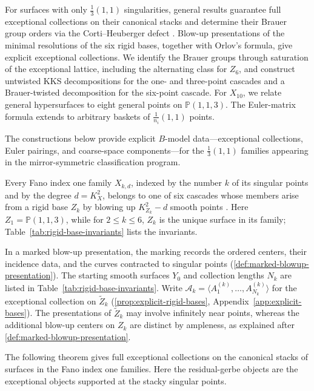 \documentclass[11pt]{article}
\theoremstyle{plain}
\theoremstyle{definition}
\theoremstyle{remark}
\begin{document}
For surfaces with only $\tfrac13(1,1)$ singularities, general results guarantee full exceptional collections on their canonical stacks and determine their Brauer group orders via the Corti--Heuberger defect \cite[Section~2.1, Proposition~18(b), Lemma~28]{Corti2016}. Blow-up presentations of the minimal resolutions of the six rigid bases, together with Orlov's formula, give explicit exceptional collections. We identify the Brauer groups through saturation of the exceptional lattice, including the alternating class for $Z_6$, and construct untwisted KKS decompositions for the one- and three-point cascades and a Brauer-twisted decomposition for the six-point cascade. For $X_{10}$, we relate general hypersurfaces to eight general points on $\mathbb P(1,1,3)$. The Euler-matrix formula extends to arbitrary baskets of $\tfrac1{n_i}(1,1)$ points.

The constructions below provide explicit $B$-model data---exceptional
collections, Euler pairings, and coarse-space components---for the
$\tfrac13(1,1)$ families appearing in the mirror-symmetric classification
program.

Every Fano index one family $X_{k,d}$, indexed by the number $k$ of its singular points and by the degree $d=K_X^2$, belongs to one of six cascades whose members arise from a rigid base $Z_k$ by blowing up $K_{Z_k}^2-d$ smooth points \cite[Theorems~4 and~6, Corollary~8]{Corti2016}. Here $Z_1=\mathbb P(1,1,3)$, while for $2\le k\le6$, $Z_k$ is the unique surface in its family; Table~\ref{tab:rigid-base-invariants} lists the invariants.

In a marked blow-up presentation, the marking records the ordered centers, their incidence data, and the curves contracted to singular points (\cref{def:marked-blowup-presentation}). The starting smooth surfaces $Y_0$ and collection lengths $N_k$ are listed in Table~\ref{tab:rigid-base-invariants}. Write $\mathcal A_k=\langle A^{(k)}_1,\dots,A^{(k)}_{N_k}\rangle$ for the exceptional collection on $\widetilde Z_k$ (\cref{prop:explicit-rigid-bases}, Appendix~\ref{app:explicit-bases}). The presentations of $\widetilde Z_k$ may involve infinitely near points, whereas the additional blow-up centers on $Z_k$ are distinct by ampleness, as explained after \cref{def:marked-blowup-presentation}.

The following theorem gives full exceptional collections on the canonical stacks of surfaces in the Fano index one families. Here the residual-gerbe objects are the exceptional objects supported at the stacky singular points.
\end{document}
